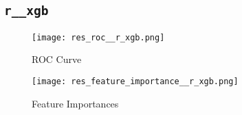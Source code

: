 \subsection{\texttt{r\_\_xgb}}
\begin{figure}[H]
\centering
\hspace*{-1.5cm}
\texttt{[image: res\_roc\_\_r\_xgb.png]}
\caption{ROC Curve}
\label{fig-7-3}
\end{figure}

\begin{figure}[H]
\centering
\hspace*{-1.5cm}
\texttt{[image: res\_feature\_importance\_\_r\_xgb.png]}
\caption{Feature Importances}
\label{fig-7-4}
\end{figure}
